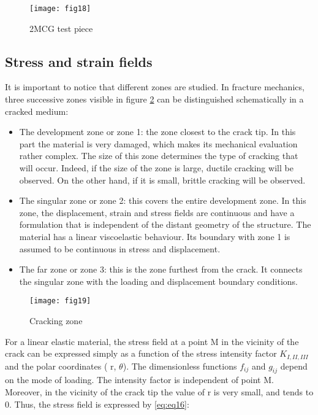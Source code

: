 \begin{figure}[tp]
	\centering
	\texttt{[image: fig18]}
	\caption{2MCG test piece \cite{MoutouPitti2008}}
	\label{fig:fig18}
\end{figure}

\subsection{Stress and strain fields}

It is important to notice that different zones are studied. In fracture mechanics, three successive zones visible in figure \ref{fig:fig19} can be distinguished schematically in a cracked medium:

\begin{itemize}
	\item The development zone or zone 1: the zone closest to the crack tip. In this part the material is very damaged, which makes its mechanical evaluation rather complex. The size of this zone determines the type of cracking that will occur. Indeed, if the size of the zone is large, ductile cracking will be observed. On the other hand, if it is small, brittle cracking will be observed.
	\item The singular zone or zone 2: this covers the entire development zone. In this zone, the displacement, strain and stress fields are continuous and have a formulation that is independent of the distant geometry of the structure. The material has a linear viscoelastic behaviour. Its boundary with zone 1 is assumed to be continuous in stress and displacement.
	\item The far zone or zone 3: this is the zone furthest from the crack. It connects the singular zone with the loading and displacement boundary conditions.
\end{itemize}


\begin{figure}[htp]
	\centering
	\texttt{[image: fig19]}
	\caption{Cracking zone \cite{MoutouPitti2008phd}}
	\label{fig:fig19}
\end{figure}

For a linear elastic material, the stress field at a point M in the vicinity of the crack can be expressed simply as a function of the stress intensity factor $K_{I,II,III}$ and the polar coordinates ( r, $\theta$). The dimensionless functions $f_{ij}$  and  $g_{ij}$ depend on the mode of loading. The intensity factor is independent of point M. Moreover, in the vicinity of the crack tip the value of r is very small, and tends to 0. Thus, the stress field is expressed by \ref{eq:eq16}:

